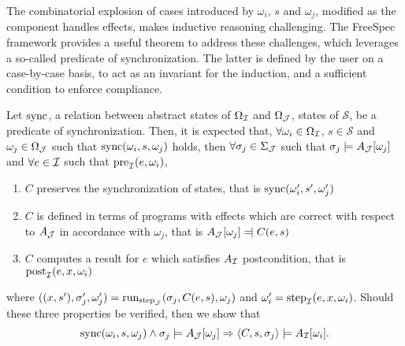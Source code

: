 The combinatorial explosion of cases introduced by $\omega_i$, $s$ and
$\omega_j$, modified as the component handles effects, makes inductive reasoning
challenging.
%
The FreeSpec framework provides a useful theorem to address these challenges,
which leverages a so-called predicate of synchronization.
%
The latter is defined by the user on a case-by-case basis, to act as an
invariant for the induction, and a sufficient condition to enforce compliance.

\begin{theorem} \label{theorem:der-compliance} Let
  $\mathrm{sync}$, a relation between abstract states of $\Omega_{\mathcal{I}}$ and
  $\Omega_{\mathcal{J}}$, states of $\mathcal{S}$, be a predicate of synchronization.
  Then, it is expected that, $\forall \omega_i \in \Omega_{\mathcal{I}}$,
  $s \in \mathcal{S}$ and $\omega_j \in \Omega_{\mathcal{J}}$ such that
  $\mathrm{sync}(\omega_i, s, \omega_j)$ holds, then
  $\forall \sigma_j \in \Sigma_{\mathcal{J}}$ such that
  $\sigma_j \models A_{\mathcal{J}}[\omega_j]$ and $\forall e \in \mathcal{I}$ such that
  $\mathrm{pre}_{\mathcal{I}}(e, \omega_i)$,
  \begin{enumerate}
  \item $C$ preserves the synchronization of states, that is
    $\mathrm{sync}(\omega_i', s', \omega_j')$
  \item $C$ is defined in terms of programs with effects which are correct with
    respect to $A_{\mathcal{J}}$ in accordance with $\omega_j$, that is
    $A_{\J}[\omega_j] \modelssym C(e, s)$
  \item $C$ computes a result for $e$ which satisfies $A_{\mathcal{I}}$ postcondition,
    that is $\mathrm{post}_{\mathcal{I}}(e, x, \omega_i)$
  \end{enumerate}
  where
  $((x, s'), \sigma_j', \omega_j') = \mathrm{run}_{\mathrm{step}_{\mathcal{J}}}(\sigma_j,
  C(e, s), \omega_j)$ and $\omega_i' = \mathrm{step}_{\mathcal{I}}(e, x, \omega_i)$.
  Should these three properties be verified, then we show that
  \[ \mathrm{sync}(\omega_i, s, \omega_j) \wedge \sigma_j \models A_{\mathcal{J}}[\omega_j]
    \Rightarrow \langle C, s, \sigma_j \rangle \models A_{\mathcal{I}}[\omega_i].
  \]
\end{theorem}

